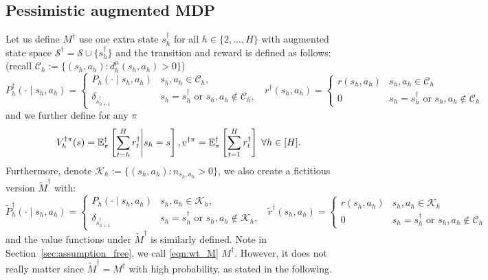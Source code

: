 \subsection{Pessimistic augmented MDP} Let us define $M^\dagger$ use one extra state $s_h^\dagger$ for all $h\in\{2,\ldots,H\}$ with augmented state space $\mathcal{S}^\dagger=\mathcal{S}\cup\{s^\dagger_h\}$ and the transition and reward is defined as follows: (recall $\mathcal{C}_h:=\{(s_h,a_h):d^\mu_h(s_h,a_h)>0\}$)
{\small
\[
P^{\dagger}_h(\cdot \mid s_h, a_h)=\left\{\begin{array}{ll}
P_h(\cdot \mid s_h, a_h) & s_h, a_h \in \mathcal{C}_h, \\
\delta_{s^{\dagger}_{h+1}} & s_h=s_h^{\dagger} \text { or } s_h, a_h \notin \mathcal{C}_h,
\end{array} \;\; r^{\dagger}( s_h, a_h)=\left\{\begin{array}{ll}
r(s_h, a_h) & s_h, a_h \in \mathcal{C}_h\\
0 & s_h=s^{\dagger}_{h} \text { or } s_h, a_h \notin \mathcal{C}_h
\end{array}\right.\right.
\]
}and we further define for any $\pi$
\begin{equation}\label{eqn:value_pMDP}
V^{\dagger \pi}_h(s)=\mathbb{E}^\dagger_\pi\left[\sum_{t=h}^H r_t^\dagger\middle| s_h=s\right], v^{\dagger\pi}=\mathbb{E}^\dagger_\pi\left[\sum_{t=1}^H r_t^\dagger\right]\;\forall h\in[H].
\end{equation}
Furthermore, denote $\mathcal{K}_h:=\{(s_h,a_h):n_{s_h,a_h}>0\}$, we also create a fictitious version $\widetilde{M}^\dagger$ with:
{\small
\begin{equation}\label{eqn:wt_M}
\widetilde{P}^{\dagger}_h(\cdot \mid s_h, a_h)=\left\{\begin{array}{ll}
P_h(\cdot \mid s_h, a_h) & s_h, a_h \in \mathcal{K}_h, \\
\delta_{s^{\dagger}_{h+1}} & s_h=s_h^{\dagger} \text { or } s_h, a_h \notin \mathcal{K}_h,
\end{array} \;\; \widetilde{r}^{\dagger}( s_h, a_h)=\left\{\begin{array}{ll}
{r}(s_h, a_h) & s_h, a_h \in \mathcal{K}_h\\
0 & s_h=s^{\dagger}_{h} \text { or } s_h, a_h \notin \mathcal{C}_h
\end{array}\right.\right.
\end{equation}
}and the value functions under $\widetilde{M}^\dagger$ is similarly defined. Note in Section~\ref{sec:assumption_free}, we call \eqref{eqn:wt_M} $M^\dagger$. However, it does not really matter since $\widetilde{M}^\dagger=M^\dagger$ with high probability, as stated in the following.

